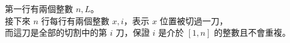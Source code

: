 第一行有兩個整數 $n, L$。\\
接下來 $n$ 行每行有兩個整數 $x, i$，表示 $x$ 位置被切過一刀，\\
而這刀是全部的切割中的第 $i$ 刀，保證 $i$ 是介於 $[1,n]$ 的整數且不會重複。\\
